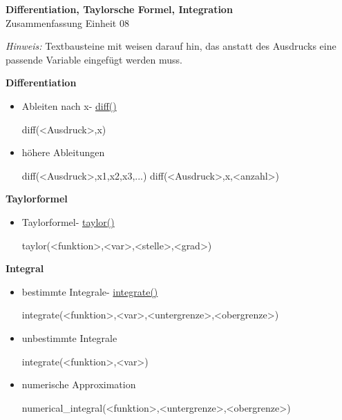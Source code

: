 \documentclass[a4paper,9pt,DIV15,twocolumn]{scrartcl}
\begin{document}
\begin{center}
    \textbf{\LARGE Differentiation, Taylorsche Formel, Integration}\\
    {\large Zusammenfassung Einheit 08}
\end{center}
\textsl{Hinweis:} Textbausteine mit  weisen darauf hin, das anstatt des Ausdrucks eine passende Variable eingefügt werden muss.

\medskip

\textbf{Differentiation}

\begin{itemize}
 \item Ableiten nach x- \href{https://sage.math.uni-goettingen.de/doc/static/reference/sage/calculus/functional.html?highlight=diff#sage.calculus.functional.diff}{diff()}
\begin{sagein}
diff(<Ausdruck>,x) 
\end{sagein}
\item höhere Ableitungen
\begin{sagein}
diff(<Ausdruck>,x1,x2,x3,...)
diff(<Ausdruck>,x,<anzahl>) 
\end{sagein}
\end{itemize}


\textbf{Taylorformel}

\begin{itemize}
 \item Taylorformel- \href{https://sage.math.uni-goettingen.de/doc/static/reference/sage/calculus/functional.html?highlight=diff#sage.calculus.functional.integral}{taylor()}
\begin{sagein}
taylor(<funktion>,<var>,<stelle>,<grad>)
\end{sagein}
\end{itemize}

\textbf{Integral}

\begin{itemize}
 \item bestimmte Integrale- \href{https://sage.math.uni-goettingen.de/doc/static/reference/sage/calculus/functional.html?highlight=diff#sage.calculus.functional.integral}{integrate()}
\begin{sagein}
integrate(<funktion>,<var>,<untergrenze>,<obergrenze>) 
\end{sagein}
\item unbestimmte Integrale
\begin{sagein}
integrate(<funktion>,<var>)
\end{sagein}
\item numerische Approximation
\begin{sagein}
numerical_integral(<funktion>,<untergrenze>,<obergrenze>) 
\end{sagein}
\end{itemize}
\end{document}
